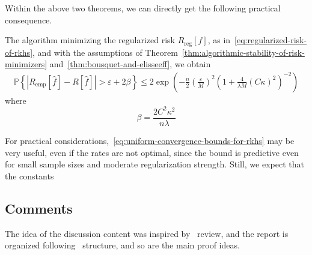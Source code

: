 Within the above two theorems, we can directly get the following practical consequence.
\begin{corollary}
	The algorithm minimizing the regularized risk \(R_{\text{reg}}[f]\), as in~\eqref{eq:regularized-risk-of-rkhs}, and with the assumptions of Theorem~\ref{thm:algorithmic-stability-of-risk-minimizers} and~\ref{thm:bousquet-and-elisseeff}, we obtain
	\begin{eqnarray}
		\label{eq:uniform-convergence-bounds-for-rkhs}
		\mathbb{P}\left\{\left|R_{\text{emp}}[\hat{f}]-R[\hat{f}]\right|>\varepsilon+2\beta\right\}\leq 2\exp\left(-\frac{n}{2}\left(\frac{\varepsilon}{M}\right)^{2}\left(1+\frac{4}{\lambda M}(C \kappa)^{2}\right)^{-2}\right)
	\end{eqnarray}
	where
	\begin{equation*}
		\beta=\frac{2C^{2}\kappa^{2}}{n\lambda}
	\end{equation*}
\end{corollary}

\begin{remark}
	For practical considerations,~\eqref{eq:uniform-convergence-bounds-for-rkhs} may be very useful, even if the rates are not optimal, since the bound is predictive even for small sample sizes and moderate regularization strength. Still, we expect that the constants
\end{remark}

\subsection*{Comments}

The idea of the discussion content was inspired by~\cite[Section 3]{hofmann2008kernel} review, and the report is organized following~\cite[Chapter 12]{scholkopf2002learning} structure, and so are the main proof ideas.

\printbibliography[heading=subbibliography]
